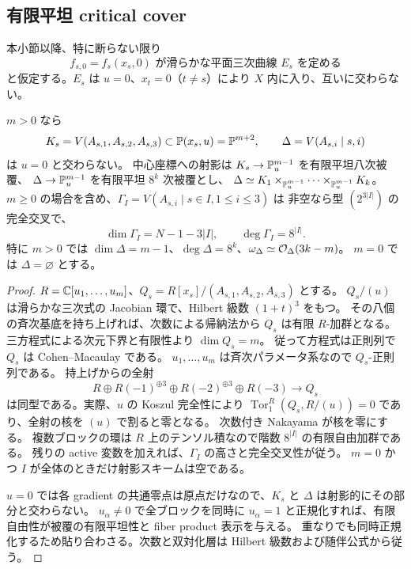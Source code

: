 \subsection{有限平坦 critical cover}
本小節以降、特に断らない限り
\begin{equation}
f_{s,0}=f_s(x_s,0)\text{ が滑らかな平面三次曲線 }E_s\text{ を定める}\label{eq:pg-smooth-block}
\end{equation}
と仮定する。$E_s$ は $u=0$、$x_t=0$（$t\neq s$）により $X$ 内に入り、互いに交わらない。
\begin{lemma}\label{lem:pg-critical-cover}
$m>0$ なら
\[
K_s=V(A_{s,1},A_{s,2},A_{s,3})\subset\mathbb P(x_s,u)=\mathbb P^{m+2},
\qquad\Delta=V(A_{s,i}\mid s,i)
\]
は $u=0$ と交わらない。
中心座標への射影は $K_s\to\mathbb P_u^{m-1}$ を有限平坦八次被覆、
$\Delta\to\mathbb P_u^{m-1}$ を有限平坦 $8^k$ 次被覆とし、
$\Delta\simeq K_1\times_{\mathbb P_u^{m-1}}\cdots\times_{\mathbb P_u^{m-1}}K_k$。
$m\geq0$ の場合を含め、$\Gamma_I=V(A_{s,i}\mid s\in I,1\leq i\leq3)$ は
非空なら型 $(2^{3|I|})$ の完全交叉で、
\[
\dim\Gamma_I=N-1-3|I|,\qquad\deg\Gamma_I=8^{|I|}.
\]
特に $m>0$ では
$\dim\Delta=m-1$、$\deg\Delta=8^k$、$\omega_\Delta\simeq\mathcal O_\Delta(3k-m)$。
$m=0$ では $\Delta=\varnothing$ とする。
\end{lemma}
\begin{proof}
$R=\mathbb C[u_1,\ldots,u_m]$、$Q_s=R[x_s]/(A_{s,1},A_{s,2},A_{s,3})$ とする。
$Q_s/(u)$ は滑らかな三次式の Jacobian 環で、Hilbert 級数 $(1+t)^3$ をもつ。
その八個の斉次基底を持ち上げれば、次数による帰納法から $Q_s$ は有限 $R$-加群となる。
三方程式による次元下界と有限性より $\dim Q_s=m$。
従って方程式は正則列で $Q_s$ は Cohen--Macaulay である。
$u_1,\ldots,u_m$ は斉次パラメータ系なので $Q_s$-正則列である。
持上げからの全射
\[
R\oplus R(-1)^{\oplus3}\oplus R(-2)^{\oplus3}\oplus R(-3)\longrightarrow Q_s
\]
は同型である。実際、$u$ の Koszul 完全性により
$\operatorname{Tor}_1^R(Q_s,R/(u))=0$ であり、全射の核を $(u)$ で割ると零となる。
次数付き Nakayama が核を零にする。
複数ブロックの環は $R$ 上のテンソル積なので階数 $8^{|I|}$ の有限自由加群である。
残りの active 変数を加えれば、$\Gamma_I$ の高さと完全交叉性が従う。
$m=0$ かつ $I$ が全体のときだけ射影スキームは空である。

$u=0$ では各 gradient の共通零点は原点だけなので、$K_s$ と $\Delta$ は射影的にその部分と交わらない。
$u_\alpha\neq0$ で全ブロックを同時に $u_\alpha=1$ と正規化すれば、有限自由性が被覆の有限平坦性と fiber product 表示を与える。
重なりでも同時正規化するため貼り合わさる。次数と双対化層は Hilbert 級数および随伴公式から従う。
\end{proof}


